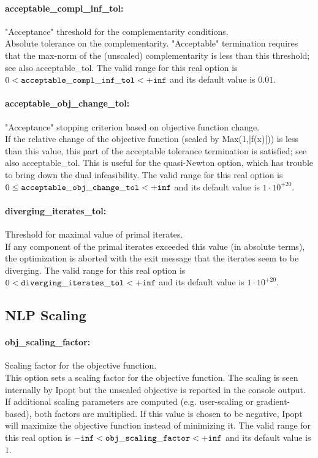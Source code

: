 \paragraph{acceptable\_compl\_inf\_tol:}\label{opt:acceptable_compl_inf_tol} "Acceptance" threshold for the complementarity conditions. \\
 Absolute tolerance on the complementarity.
"Acceptable" termination requires that the
max-norm of the (unscaled) complementarity is
less than this threshold; see also
acceptable\_tol. The valid range for this real option is 
$0 <  {\tt acceptable\_compl\_inf\_tol } <  {\tt +inf}$
and its default value is $0.01$.


\paragraph{acceptable\_obj\_change\_tol:}\label{opt:acceptable_obj_change_tol} "Acceptance" stopping criterion based on objective function change. \\
 If the relative change of the objective function
(scaled by Max(1,|f(x)|)) is less than this
value, this part of the acceptable tolerance
termination is satisfied; see also
acceptable\_tol.  This is useful for the
quasi-Newton option, which has trouble to bring
down the dual infeasibility. The valid range for this real option is 
$0 \le {\tt acceptable\_obj\_change\_tol } <  {\tt +inf}$
and its default value is $1 \cdot 10^{+20}$.


\paragraph{diverging\_iterates\_tol:}\label{opt:diverging_iterates_tol} Threshold for maximal value of primal iterates. \\
 If any component of the primal iterates exceeded
this value (in absolute terms), the optimization
is aborted with the exit message that the
iterates seem to be diverging. The valid range for this real option is 
$0 <  {\tt diverging\_iterates\_tol } <  {\tt +inf}$
and its default value is $1 \cdot 10^{+20}$.


\subsection{NLP Scaling}

\paragraph{obj\_scaling\_factor:}\label{opt:obj_scaling_factor} Scaling factor for the objective function. \\
 This option sets a scaling factor for the
objective function. The scaling is seen
internally by Ipopt but the unscaled objective is
reported in the console output. If additional
scaling parameters are computed (e.g.
user-scaling or gradient-based), both factors are
multiplied. If this value is chosen to be
negative, Ipopt will maximize the objective
function instead of minimizing it. The valid range for this real option is 
${\tt -inf} <  {\tt obj\_scaling\_factor } <  {\tt +inf}$
and its default value is $1$.


